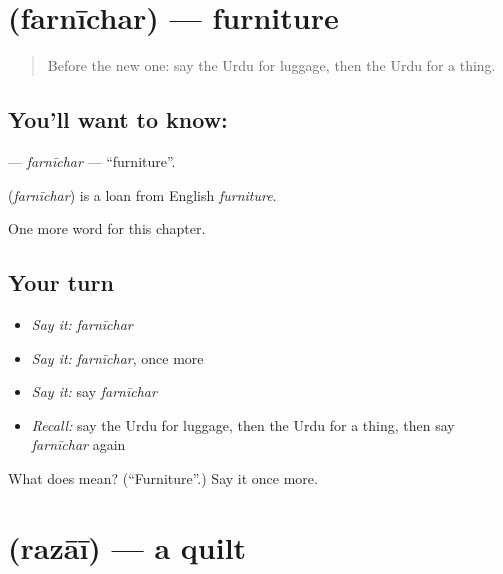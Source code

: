 \section[\texorpdfstring{\ur{فرنیچر} (farnīchar)}{فرنیچر (farnīchar)}]{ (farnīchar) — furniture}

\label{lesson:UR-C164-farnichar}



\begin{quote}
Before the new one: say the Urdu for luggage, then the Urdu for a thing.
\end{quote}

\subsection*{You'll want to know: }
\textbf{} — \emph{farnīchar} — \textquotedblleft{}furniture\textquotedblright{}.

\begin{cousinweb}
\textbf{} (\emph{farnīchar}) is a loan from English \emph{furniture}.
\end{cousinweb}

\begin{grammarlens}[title={What you've built}]
One more word for this chapter.
\end{grammarlens}

\subsection*{Your turn}
\begin{itemize}
\raggedright
  \item \emph{Say it:} \emph{farnīchar}
  \item \emph{Say it:} \emph{farnīchar}, once more
  \item \emph{Say it:} say \emph{farnīchar}
  \item \emph{Recall:} say the Urdu for luggage, then the Urdu for a thing, then say \emph{farnīchar} again
\end{itemize}

\begin{tcolorbox}[breakable,colback=teal!4,colframe=teal!35!black,title={Before you move on}]
What does  mean? (\textquotedblleft{}Furniture\textquotedblright{}.) Say it once more.
\end{tcolorbox}
\section[\texorpdfstring{\ur{رضائی} (razāī)}{رضائی (razāī)}]{ (razāī) — a quilt}


